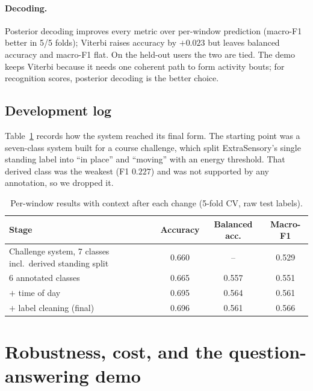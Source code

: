 \documentclass[11pt,a4paper]{article}
\begin{document}
\paragraph{Decoding.} Posterior decoding improves every metric over per-window prediction
(macro-F1 better in 5/5 folds); Viterbi raises accuracy by $+0.023$ but leaves balanced
accuracy and macro-F1 flat. On the held-out users the two are tied. The demo keeps
Viterbi because it needs one coherent path to form activity bouts; for recognition
scores, posterior decoding is the better choice.

\subsection{Development log}

Table~\ref{tab:phases} records how the system reached its final form. The starting point
was a seven-class system built for a course challenge, which split ExtraSensory's single
standing label into ``in place'' and ``moving'' with an energy threshold. That derived
class was the weakest (F1 $0.227$) and was not supported by any annotation, so we dropped
it.

\begin{table}[H]
\centering\small
\caption{Per-window results with context after each change (5-fold CV, raw test labels).}
\label{tab:phases}
\begin{tabular}{@{}lccc@{}}
\toprule
Stage & Accuracy & Balanced acc. & Macro-F1 \\
\midrule
Challenge system, 7 classes incl.\ derived standing split & 0.660 & -- & 0.529 \\
6 annotated classes                    & 0.665 & 0.557 & 0.551 \\
$+$ time of day                        & 0.695 & 0.564 & 0.561 \\
$+$ label cleaning (final)             & 0.696 & 0.561 & 0.566 \\
\bottomrule
\end{tabular}
\end{table}

\section{Robustness, cost, and the question-answering demo}
\label{sec:demo}
\end{document}

